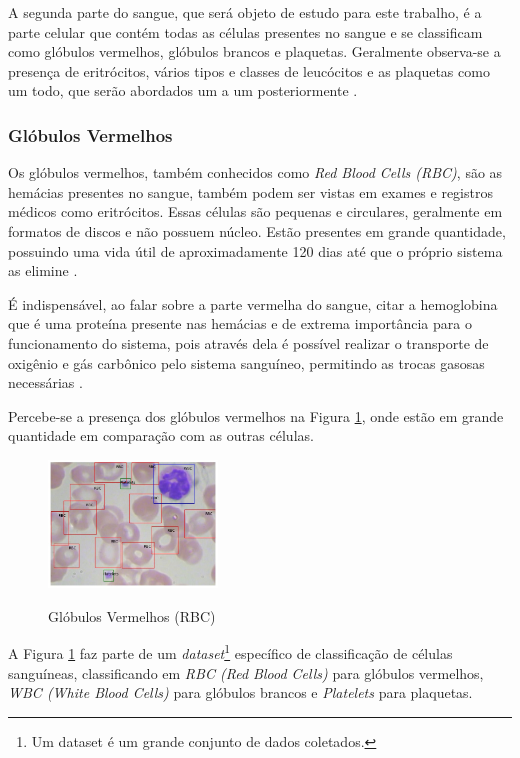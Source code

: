 A segunda parte do sangue, que será objeto de estudo para este trabalho, é a parte celular que contém todas as células presentes no sangue e se classificam como glóbulos vermelhos, glóbulos brancos e plaquetas. Geralmente observa-se a presença de eritrócitos, vários tipos e classes de leucócitos e as plaquetas como um todo, que serão abordados um a um posteriormente \cite{manualHematologia}.

\subsubsection{Glóbulos Vermelhos}
Os glóbulos vermelhos, também conhecidos como \emph{Red Blood Cells (RBC)}, são as hemácias presentes no sangue, também podem ser vistas em exames e registros médicos como eritrócitos. Essas células são pequenas e circulares, geralmente em formatos de discos e não possuem núcleo. Estão presentes em grande quantidade, possuindo uma vida útil de aproximadamente 120 dias até que o próprio sistema as elimine \cite{manualHematologia}.

É indispensável, ao falar sobre a parte vermelha do sangue, citar a hemoglobina que é uma proteína presente nas hemácias e de extrema importância para o funcionamento do sistema, pois através dela é possível realizar o transporte de oxigênio e gás carbônico pelo sistema sanguíneo, permitindo as trocas gasosas necessárias \cite{manualHematologia}.

Percebe-se a presença dos glóbulos vermelhos na Figura \ref{fig:rbc}, onde estão em grande quantidade em comparação com as outras células. 

\begin{figure}[!htb]
	\centering
	\caption{Glóbulos Vermelhos (RBC)}
	\includegraphics[width=0.40\textwidth]{img/rbc.jpg}
	\label{fig:rbc}
\end{figure}

A Figura \ref{fig:rbc} faz parte de um \emph{dataset}\footnote[1]{Um dataset é um grande conjunto de dados coletados.} específico de classificação de células sanguíneas, classificando em \emph{RBC (Red Blood Cells)} para glóbulos vermelhos, \emph{WBC (White Blood Cells)} para glóbulos brancos e \emph{Platelets} para plaquetas.
 
